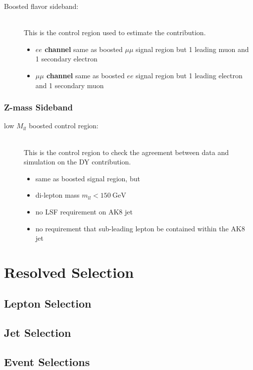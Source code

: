 \begin{description}
\item[Boosted flavor sideband:]\ \\  This is the control region used to estimate the \ttbar contribution.
  \begin{itemize}
  \item \textbf{$ee$ channel} same as boosted $\mu\mu$ signal region but 1 leading muon and 1 secondary electron
  \item \textbf{$\mu\mu$ channel} same as boosted $ee$ signal region but 1 leading electron and 1 secondary muon
  \end{itemize}
\end{description}

\subsubsection{Z-mass Sideband}

\begin{description}
\item[low $M_{ll}$ boosted control region:]\ \\ This is the control region to check the agreement between data and simulation on the DY contribution.
  \begin{itemize}
  \item same as boosted signal region, but
  \item di-lepton mass $m_{ll} < \SI{150}{\GeV}$
  \item no LSF requirement on AK8 jet
  \item no requirement that sub-leading lepton be contained within the AK8 jet
  \end{itemize}
\end{description}

\section{Resolved Selection}

\subsection{Lepton Selection}

\subsection{Jet Selection}

\subsection{Event Selections}

